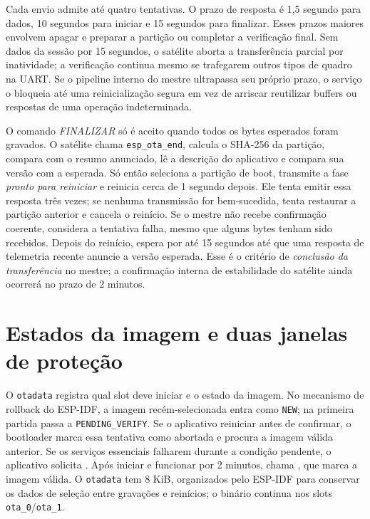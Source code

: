 Cada envio admite até quatro tentativas. O prazo de resposta é 1,5 segundo para dados, 10 segundos para iniciar e 15 segundos para finalizar. Esses prazos maiores envolvem apagar e preparar a partição ou completar a verificação final. Sem dados da sessão por 15 segundos, o satélite aborta a transferência parcial por inatividade; a verificação continua mesmo se trafegarem outros tipos de quadro na UART. Se o pipeline interno do mestre ultrapassa seu próprio prazo, o serviço o bloqueia até uma reinicialização segura em vez de arriscar reutilizar buffers ou respostas de uma operação indeterminada.

O comando \emph{FINALIZAR} só é aceito quando todos os bytes esperados foram gravados. O satélite chama \texttt{esp\_ota\_end}, calcula o SHA-256 da partição, compara com o resumo anunciado, lê a descrição do aplicativo e compara sua versão com a esperada. Só então seleciona a partição de boot, transmite a fase \emph{pronto para reiniciar} e reinicia cerca de 1 segundo depois. Ele tenta emitir essa resposta três vezes; se nenhuma transmissão for bem-sucedida, tenta restaurar a partição anterior e cancela o reinício. Se o mestre não recebe confirmação coerente, considera a tentativa falha, mesmo que alguns bytes tenham sido recebidos. Depois do reinício, espera por até 15 segundos até que uma resposta de telemetria recente anuncie a versão esperada. Esse é o critério de \emph{conclusão da transferência} no mestre; a confirmação interna de estabilidade do satélite ainda ocorrerá no prazo de 2 minutos.

\section{Estados da imagem e duas janelas de proteção}
O \texttt{otadata} registra qual slot deve iniciar e o estado da imagem. No mecanismo de rollback do ESP-IDF, a imagem recém-selecionada entra como \texttt{NEW}; na primeira partida passa a \texttt{PENDING\_VERIFY}. Se o aplicativo reiniciar antes de confirmar, o bootloader marca essa tentativa como abortada e procura a imagem válida anterior. Se os serviços essenciais falharem durante a condição pendente, o aplicativo solicita . Após iniciar e funcionar por 2 minutos, chama , que marca a imagem válida. O \texttt{otadata} tem 8 KiB, organizados pelo ESP-IDF para conservar os dados de seleção entre gravações e reinícios; o binário continua nos slots \texttt{ota\_0}/\texttt{ota\_1}.


